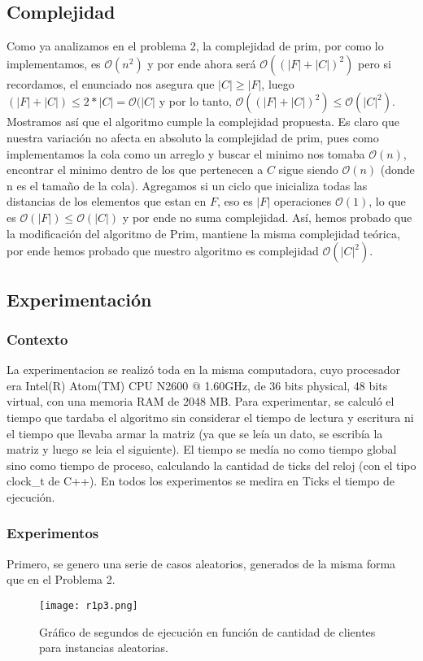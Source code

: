\documentclass[A4paper,oneside,fleqn,11pt]{article}
\theoremstyle{definition}
\begin{document}
\subsection{Complejidad}

Como ya analizamos en el problema 2, la complejidad de prim, por como lo implementamos, es $\mathcal{O} (n^2)$ y por ende ahora será $\mathcal{O} ((|F|+|C|)^2)$ pero si recordamos, el enunciado nos asegura que $|C| \geq |F|$, luego $(|F|+|C|) \leq 2 *|C| = \mathcal{O} (|C|$ y por lo tanto, $\mathcal{O} ((|F|+|C|)^2) \leq \mathcal{O} (|C|^2)$. Mostramos así que el algoritmo cumple la complejidad propuesta. Es claro que nuestra variación no afecta en absoluto la complejidad de prim, pues como implementamos la cola como un arreglo y buscar el minimo nos tomaba $\mathcal{O} (n)$, encontrar el minimo dentro de los que pertenecen a $C$ sigue siendo $\mathcal{O} (n)$ (donde n es el tamaño de la cola). Agregamos si un ciclo que inicializa todas las distancias de los elementos que estan en $F$, eso es $|F|$ operaciones $\mathcal{O} (1)$, lo que es $\mathcal{O} (|F|) \leq \mathcal{O} (|C|)$ y por ende no suma complejidad. Así, hemos probado que la modificación del algoritmo de Prim, mantiene la misma complejidad teórica, por ende hemos probado que nuestro algoritmo es complejidad $\mathcal{O} (|C|^2)$.

\subsection{Experimentación}

\subsubsection{Contexto}
La experimentacion se realizó toda en la misma computadora, cuyo procesador era Intel(R) Atom(TM) CPU N2600 @ 1.60GHz, de 36 bits physical, 48 bits virtual, con una memoria RAM de 2048 MB.  Para experimentar, se calculó el tiempo que tardaba el algoritmo sin considerar el tiempo de lectura y escritura ni el tiempo que llevaba armar la matriz (ya que se leía un dato, se escribía la matriz y luego se leia el siguiente). 
El tiempo se medía no como tiempo global sino como tiempo de proceso, calculando la cantidad de ticks del reloj (con el tipo clock\_t de C++). En todos los experimentos se medira en Ticks el tiempo de ejecución.
\subsubsection{Experimentos}
Primero, se genero una serie de casos aleatorios, generados de la misma forma que en el Problema 2.
\begin{wrapfigure}{R}{0.4\textwidth}
\centering
\texttt{[image: r1p3.png]}
\caption{ Gráfico de segundos de ejecución en función de cantidad de clientes para instancias aleatorias.}
\end{wrapfigure}
\end{document}
